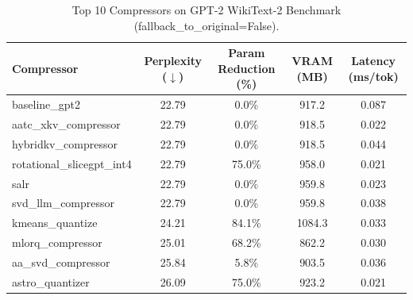 \begin{table}[h]
\centering
\small
\caption{Top 10 Compressors on GPT-2 WikiText-2 Benchmark (fallback\_to\_original=False).}
\label{tab:wikitext2_pareto}
\begin{tabular}{lcccc}
\toprule
\textbf{Compressor} & \textbf{Perplexity ($\downarrow$)} & \textbf{Param Reduction (\%)} & \textbf{VRAM (MB)} & \textbf{Latency (ms/tok)} \\
\midrule
baseline\_gpt2 & 22.79 & 0.0\% & 917.2 & 0.087 \\
aatc\_xkv\_compressor & 22.79 & 0.0\% & 918.5 & 0.022 \\
hybridkv\_compressor & 22.79 & 0.0\% & 918.5 & 0.044 \\
rotational\_slicegpt\_int4 & 22.79 & 75.0\% & 958.0 & 0.021 \\
salr & 22.79 & 0.0\% & 959.8 & 0.023 \\
svd\_llm\_compressor & 22.79 & 0.0\% & 959.8 & 0.038 \\
kmeans\_quantize & 24.21 & 84.1\% & 1084.3 & 0.033 \\
mlorq\_compressor & 25.01 & 68.2\% & 862.2 & 0.030 \\
aa\_svd\_compressor & 25.84 & 5.8\% & 903.5 & 0.036 \\
astro\_quantizer & 26.09 & 75.0\% & 923.2 & 0.021 \\
\bottomrule
\end{tabular}
\end{table}
